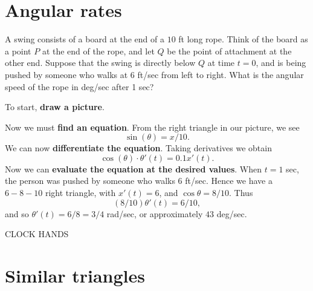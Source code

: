 \documentclass{ximera}
\begin{document}
\section{Angular rates}

\begin{example}
A swing consists of a board at the end of a $10$ ft long rope.  Think
of the board as a point $P$ at the end of the rope, and let $Q$ be the
point of attachment at the other end.  Suppose that the swing is
directly below $Q$ at time $t=0$, and is being pushed by someone who
walks at 6 ft/sec from left to right.  What is the angular speed of
the rope in deg/sec after 1 sec?
\end{example}

\begin{solution}
To start, \textbf{draw a picture}.


Now we must \textbf{find an equation}. From the right triangle in our
picture, we see
\[
\sin(\theta)=x/10.
\]
We can now \textbf{differentiate the equation}. Taking derivatives we obtain 
\[
\cos(\theta)\cdot \theta'(t)=0.1 x'(t).
\]
Now we can \textbf{evaluate the equation at the desired values}.  When
$t=1$ sec, the person was pushed by someone who walks $6$
ft/sec. Hence we have a $6-8-10$ right triangle, with $x'(t) = 6$, and
$\cos\theta=8/10$. Thus
\[
(8/10) \theta'(t) =6/10,
\]
and so  $\theta'(t)=6/8=3/4$ rad/sec, or approximately $43$ deg/sec.
\end{solution} 


CLOCK HANDS



\section{Similar triangles}
\end{document}
